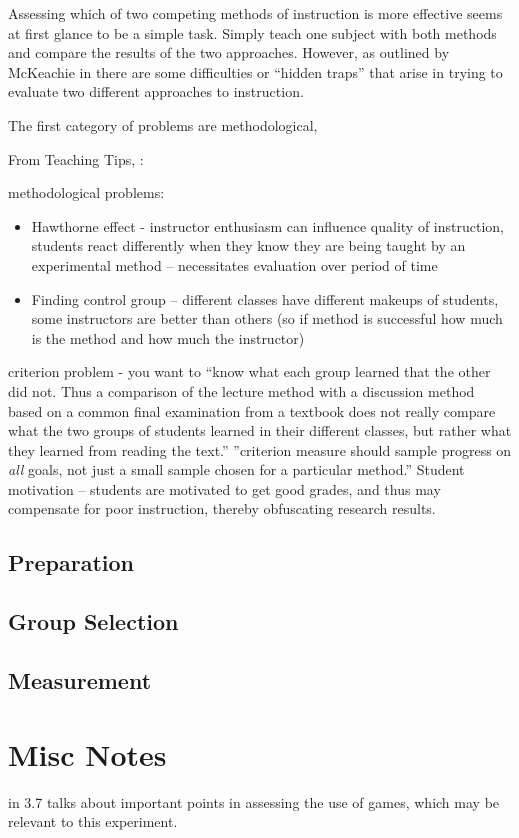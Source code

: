 Assessing which of two competing methods of instruction is more effective seems at first glance to be a simple task.  Simply teach one subject with both methods and compare the results of the two approaches.  However, as outlined by McKeachie in \cite{teachingTips} there are some difficulties or ``hidden traps'' that arise in trying to evaluate two different approaches to instruction.

The first category of problems are methodological, 

From Teaching Tips, \cite{teachingTips}:

methodological problems:

\begin{itemize}
	\item Hawthorne effect - instructor enthusiasm can influence quality of instruction, students react differently when they know they are being taught by an experimental method -- necessitates evaluation over period of time
	\item Finding control group -- different classes have different makeups of students, some instructors are better than others (so if method is successful how much is the method and how much the instructor)
\end{itemize}

criterion problem - you want to ``know what each group learned that the other did not.  Thus a comparison of the lecture method with a discussion method based on a common final examination from a textbook does not really compare what the two groups of students learned in their different classes, but rather what they learned from reading the text.''  ''criterion measure should sample progress on \textit{all} goals, not just a small sample chosen for a particular method.''  Student motivation -- students are motivated to get good grades, and thus may compensate for poor instruction, thereby obfuscating research results.

\subsection{Preparation}


\subsection{Group Selection}


\subsection{Measurement}

\section{Misc Notes}

\cite{Bayliss09} in 3.7 talks about important points in assessing the use of games, which may be relevant to this experiment.